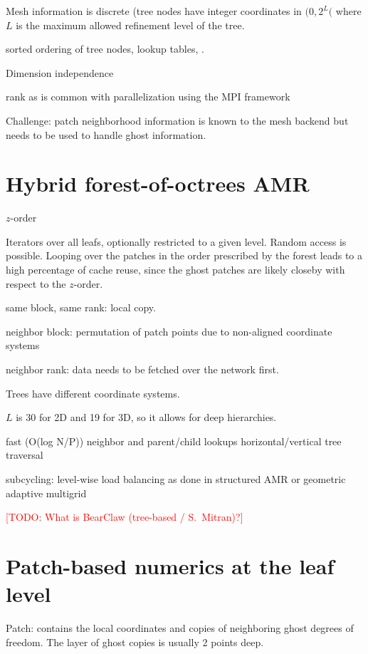 \documentclass{IOS-Book-Article}     %
\newcommand{\todo}[1]{\textcolor{red}{[TODO: #1]}\xspace}
\begin{document}
Mesh information is discrete (tree nodes have integer coordinates in
$(0, 2^L($ where $L$ is the maximum allowed refinement level of the tree.

sorted ordering of tree nodes, lookup tables, .

Dimension independence


rank as is common with parallelization using the MPI framework

Challenge: patch neighborhood information is known to the mesh backend
but needs to be used to handle ghost information.



\section*{Hybrid forest-of-octrees AMR}


$z$-order

Iterators over all leafs, optionally restricted to a given level.
Random access is possible.  Looping over the patches in the order prescribed
by the forest leads to a high percentage of cache reuse, since the ghost
patches are likely closeby with respect to the $z$-order.


same block, same rank: local copy.

neighbor block: permutation of patch points due to non-aligned
coordinate systems

neighbor rank: data needs to be fetched over the network first.

Trees have different coordinate systems.

$L$ is 30 for 2D and 19 for 3D, so it allows for deep hierarchies.

fast (O(log N/P)) neighbor and parent/child lookups
horizontal/vertical tree traversal


subcycling: level-wise load balancing as done in structured AMR or
geometric adaptive multigrid \cite{SundarBirosBursteddeEtAl12}


\todo{What is BearClaw (tree-based / S.\ Mitran)?}


\section*{Patch-based numerics at the leaf level}


Patch: contains the local coordinates and copies of neighboring ghost degrees
of freedom.  The layer of ghost copies is usually 2 points deep.
\end{document}

